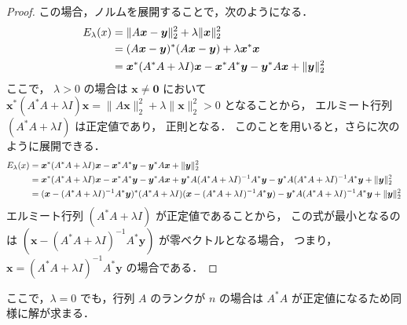 \begin{proof}
    この場合，ノルムを展開することで，次のようになる．
    \begin{align}
        E_{\lambda}(x)
         & = \|A \bm{x} - \bm{y}\|_2^2 + \lambda \|\bm{x}\|_2^2
        \notag                                                                                              \\
         & = (A \bm{x} - \bm{y})^* (A \bm{x} - \bm{y}) + \lambda \bm{x}^* \bm{x}
        \notag                                                                                              \\
         & = \bm{x}^* (A^* A + \lambda I) \bm{x} - \bm{x}^* A^* \bm{y} - \bm{y}^* A \bm{x} + \|\bm{y}\|_2^2
    \end{align}
    ここで，
    $\lambda > 0$ の場合は
    $\bm{x} \neq \bm{0}$ において
    $\bm{x}^* (A^* A + \lambda I) \bm{x} = \|A \bm{x}\|_2^2 + \lambda \|\bm{x}\|_2^2 > 0$
    となることから，
    エルミート行列 $(A^* A + \lambda I)$ は正定値であり，
    正則となる．
    このことを用いると，さらに次のように展開できる．
    \begin{align}
        E_{\lambda}(x)
         & = \bm{x}^* (A^* A + \lambda I) \bm{x} - \bm{x}^* A^* \bm{y} - \bm{y}^* A \bm{x} + \|\bm{y}\|_2^2
        \notag                                                                                              \\
         & = \bm{x}^* (A^* A + \lambda I) \bm{x} - \bm{x}^* A^* \bm{y} - \bm{y}^* A \bm{x}
        + \bm{y}^* A (A^* A + \lambda I)^{-1} A^* \bm{y}
        - \bm{y}^* A (A^* A + \lambda I)^{-1} A^* \bm{y}
        + \|\bm{y}\|_2^2
        \notag                                                                                              \\
         & = (\bm{x} - (A^* A + \lambda I)^{-1} A^* \bm{y})^*
        (A^* A + \lambda I)
        (\bm{x} - (A^* A + \lambda I)^{-1} A^* \bm{y})
        - \bm{y}^* A (A^* A + \lambda I)^{-1} A^* \bm{y}
        + \|\bm{y}\|_2^2
    \end{align}
    エルミート行列 $(A^* A + \lambda I)$ が正定値であることから，
    この式が最小となるのは
    $(\bm{x} - (A^* A + \lambda I)^{-1} A^* \bm{y})$
    が零ベクトルとなる場合，
    つまり，
    $\bm{x} = (A^* A + \lambda I)^{-1} A^* \bm{y}$
    の場合である．
\end{proof}

ここで，$\lambda = 0$ でも，行列 $A$ のランクが $n$ の場合は $A^*A$ が正定値になるため同様に解が求まる．

